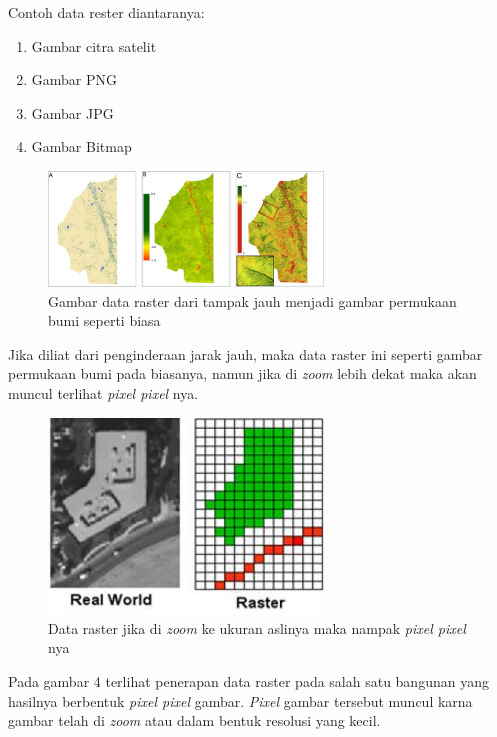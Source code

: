 Contoh data rester diantaranya:
\begin{enumerate}
\item Gambar citra satelit
\item Gambar PNG
\item Gambar JPG
\item Gambar Bitmap
\end{enumerate}
		\begin{figure}[htbp]
		\centering
		\includegraphics[width=0.65\textwidth]{pictures/dataraster.jpg}
		\caption{Gambar data raster dari tampak jauh menjadi gambar permukaan bumi seperti biasa}
		\label{labelgambar3}
		\end{figure}
Jika diliat dari penginderaan jarak jauh, maka data raster ini seperti gambar permukaan bumi pada biasanya, namun jika di \textit{zoom} lebih dekat maka akan muncul terlihat \textit{pixel pixel} nya.
		\begin{figure}[htbp]
		\centering
		\includegraphics[width=0.65\textwidth]{pictures/datarasterzoom.jpg}
		\caption{Data raster jika di \textit{zoom} ke ukuran aslinya maka nampak \textit{pixel pixel} nya}
		\label{labelgambar4}
		\end{figure}
Pada gambar 4 terlihat penerapan data raster pada salah satu bangunan yang hasilnya berbentuk \textit{pixel pixel} gambar. \textit{Pixel} gambar tersebut muncul karna gambar telah di \textit{zoom} atau dalam bentuk resolusi yang kecil.

